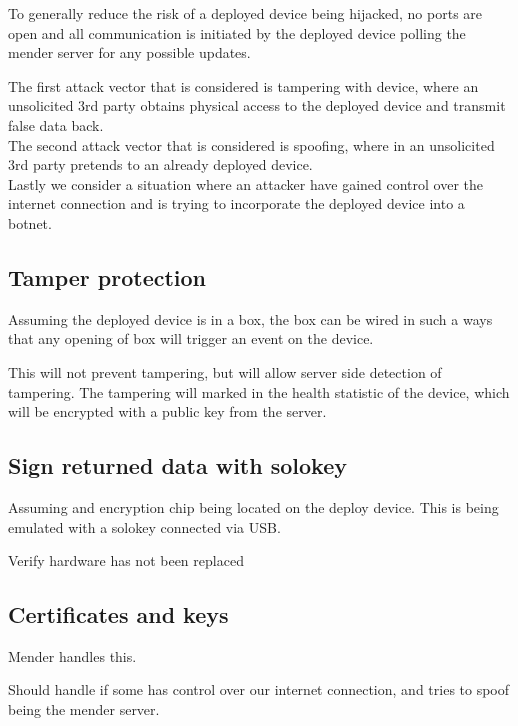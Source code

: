 \documentclass[../../main.tex]{subfiles}
\begin{document}
To generally reduce the risk of a deployed device being hijacked, no ports are open and 
all communication is initiated by the deployed device polling the  mender server for any possible
updates.

The first attack vector that is considered is tampering with device, where an 
unsolicited 3rd party obtains physical access to the deployed device and
transmit false data back.\\

The second attack vector that is considered is spoofing, where in an unsolicited 3rd
party pretends to an already deployed device.\\

Lastly we consider a situation where an attacker have gained control over the
internet connection and is trying to incorporate the deployed device into a botnet.


\subsection{Tamper protection}%
\label{sub:tamper_protection}

Assuming the deployed device is in a box, the box can be wired in such a ways that any opening of
box will trigger an event on the device.

This will not prevent tampering, but will allow server side detection of tampering.
The tampering will marked in the health statistic of the device, which will be encrypted with a
public key from the server.


\subsection{Sign returned data with solokey}%
\label{sub:sign_returned_data_with_solokey}

Assuming and encryption chip being located on the deploy device. This is being emulated with a
solokey connected via USB.

Verify hardware has not been replaced

\subsection{Certificates and keys}%
\label{sub:certificates_and_keys}

Mender handles this.

Should handle if some has control over our internet connection, and tries to spoof being the
mender server.



	
\end{document}
